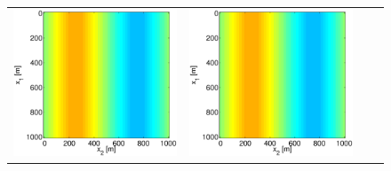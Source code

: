 \documentclass{iopart}
\begin{document}
\begin{figure}
\begin{tabular}{cccc}
\includegraphics[scale=.2]{./figs/2D_exp0_e}&
\includegraphics[scale=.2]{./figs/2D_exp0_f}&

\end{tabular}
\end{figure}
\end{document}
